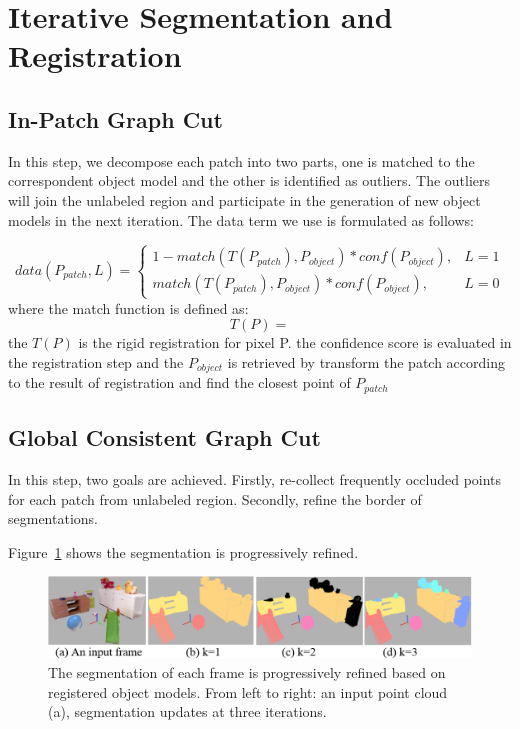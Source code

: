 \section{Iterative Segmentation and Registration}
\label{sec:segmentation}


\subsection{In-Patch Graph Cut}
In this step, we decompose each patch into two parts, one is matched to the correspondent object model and the other is identified as outliers. The outliers will join the unlabeled region and participate in the generation of new object models in the next iteration.
The data term we use is formulated as follows:

\begin{equation}
\label{eq:dataterm}
data(P_{patch},L)=\left\{
\begin{aligned}
1 - match(T(P_{patch}),P_{object}) * conf(P_{object}), & L = 1 \\
match(T(P_{patch}),P_{object}) * conf(P_{object}), & L = 0 
\end{aligned}
\right.
\end{equation}
where the match function is defined as:
\begin{equation}
\label{eq:match-function}
T(P)=
\end{equation}
the $T(P)$ is the rigid registration for pixel P.
the confidence score is evaluated in the registration step
and the $P_{object}$ is retrieved by transform the patch according to the result of registration and find the closest point of $P_{patch}$ 


\subsection{Global Consistent Graph Cut}
In this step, two goals are achieved. Firstly, re-collect frequently occluded points for each patch from unlabeled region. Secondly, refine the border of segmentations. 


Figure~\ref{fig:object-iterations} shows the segmentation is progressively refined. 

\begin{figure}
\centering
\includegraphics[width=2\columnwidth]{figures/object-iterations.png}
\caption{ The segmentation of each frame is progressively refined based on registered object models. From left to right: an input point cloud (a), segmentation updates at three iterations.  	 }
\label{fig:object-iterations}
\end{figure}
